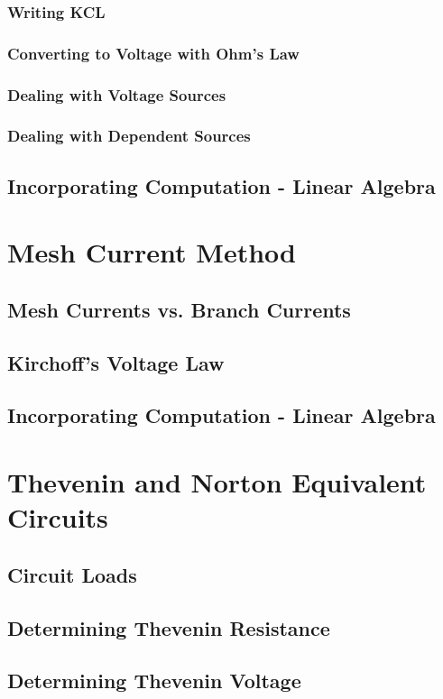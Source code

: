 \documentclass[a4paper,11pt]{book}
\begin{document}
\subsection*{Writing KCL}
\subsection*{Converting to Voltage with Ohm's Law}
\subsection*{Dealing with Voltage Sources}
\subsection*{Dealing with Dependent Sources}
\section{Incorporating Computation - Linear Algebra}
\chapter{Mesh Current Method}
\section{Mesh Currents vs. Branch Currents}
\section{Kirchoff's Voltage Law}
\section{Incorporating Computation - Linear Algebra}
\chapter{Thevenin and Norton Equivalent Circuits}
\section{Circuit Loads}
\section{Determining Thevenin Resistance}
\section{Determining Thevenin Voltage}
\end{document}
